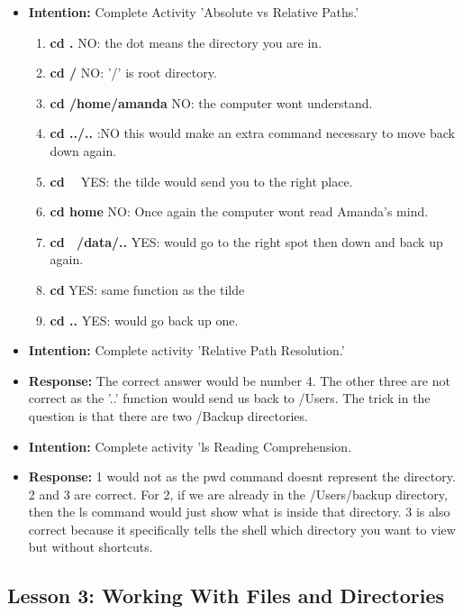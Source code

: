 \documentclass{article}
\begin{document}
\begin{itemize}
\item{\textbf{Intention:} Complete Activity 'Absolute vs Relative Paths.'}
\begin{enumerate}

\item{\textbf{cd .} NO: the dot means the directory you are in.}
\item{\textbf{cd /} NO: '/' is root directory.}
\item{\textbf{cd /home/amanda} NO: the computer wont understand.}
\item{\textbf{cd ../..} :NO this would make an extra command necessary to move back down again.}
\item{\textbf{cd ~} YES: the tilde would send you to the right place.}
\item{\textbf{cd home} NO: Once again the computer wont read Amanda's mind.}
\item{\textbf{cd ~/data/..} YES: would go to the right spot then down and back up again.}
\item{\textbf{cd} YES: same function as the tilde}
\item{\textbf{cd ..} YES: would go back up one.}


\end{enumerate}
\end{itemize}

\begin{itemize}
\item{\textbf{Intention:} Complete activity 'Relative Path Resolution.' }
\item{\textbf{Response:} The correct answer would be number 4. The other three are not correct as the '..' function would send us back to /Users. The trick in the question is that there are two /Backup directories.}

\item{\textbf{Intention:} Complete activity 'ls Reading Comprehension.}
\item{\textbf{Response:} 1 would not as the pwd command doesnt represent the directory. 2 and 3 are correct. For 2, if we are already in the /Users/backup directory, then the ls command would just show what is inside that directory. 3 is also correct because it specifically tells the shell which directory you want to view but without shortcuts.}

\end{itemize}

\subsection{ Lesson 3: Working With Files and Directories}
\end{document}

